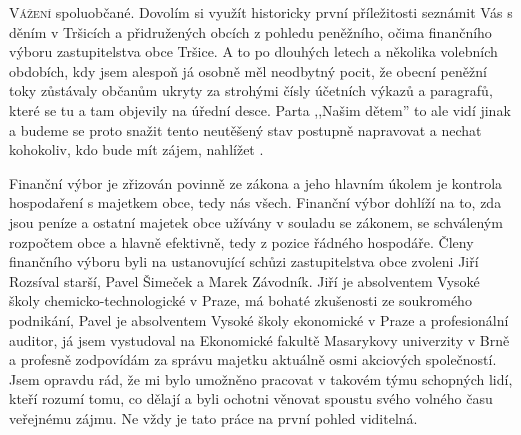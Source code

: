 \documentclass{article}
\begin{document}
\begin{multicols}{2}{

\lettrine{V}{ážení} spoluobčané. Dovolím si využít historicky první příležitosti seznámit Vás s děním v Tršicích a  přidružených obcích z pohledu peněžního, očima finančního výboru zastupitelstva obce Tršice. A to po dlouhých letech a několika volebních obdobích, kdy jsem alespoň já osobně měl neodbytný pocit, že obecní peněžní toky zůstávaly občanům ukryty za strohými čísly účetních výkazů a paragrafů, které se tu a tam objevily na úřední desce. Parta ,,Našim dětem'' to ale vidí jinak a budeme se proto snažit tento neutěšený stav postupně napravovat a nechat kohokoliv, kdo bude mít zájem, nahlížet .

Finanční výbor je zřizován povinně ze zákona a jeho hlavním úkolem je kontrola hospodaření s majetkem obce, tedy nás všech. Finanční výbor dohlíží na to, zda jsou peníze a ostatní majetek obce užívány v souladu se zákonem, se schváleným rozpočtem obce a hlavně efektivně, tedy z pozice řádného hospodáře. Členy finančního výboru byli na ustanovující schůzi zastupitelstva obce zvoleni Jiří Rozsíval starší, Pavel Šimeček a Marek Závodník. Jiří je absolventem Vysoké školy chemicko-technologické v Praze, má bohaté zkušenosti ze soukromého podnikání, Pavel je absolventem Vysoké školy ekonomické v Praze a profesionální auditor, já jsem vystudoval na Ekonomické fakultě Masarykovy univerzity v Brně a profesně zodpovídám za správu majetku aktuálně osmi akciových společností. Jsem opravdu rád, že mi bylo umožněno pracovat v takovém týmu schopných lidí, kteří rozumí tomu, co dělají a byli ochotni věnovat spoustu svého volného času veřejnému zájmu. Ne vždy je tato práce na první pohled viditelná.

}
\end{multicols}
\end{document}

